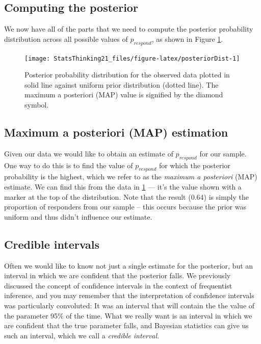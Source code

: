 \documentclass[
  12pt,
]{book}
\begin{document}
\hypertarget{computing-the-posterior-1}{%
\subsection{Computing the posterior}\label{computing-the-posterior-1}}

We now have all of the parts that we need to compute the posterior probability distribution across all possible values of \(p_{respond}\), as shown in Figure \ref{fig:posteriorDist}.

\begin{figure}
\texttt{[image: StatsThinking21\_files/figure-latex/posteriorDist-1]} \caption{Posterior probability distribution for the observed data plotted in solid line against uniform prior distribution (dotted line). The maximum a posteriori (MAP) value is signified by the diamond symbol.}\label{fig:posteriorDist}
\end{figure}

\hypertarget{maximum-a-posteriori-map-estimation}{%
\subsection{Maximum a posteriori (MAP) estimation}\label{maximum-a-posteriori-map-estimation}}

Given our data we would like to obtain an estimate of \(p_{respond}\) for our sample. One way to do this is to find the value of \(p_{respond}\) for which the posterior probability is the highest, which we refer to as the \emph{maximum a posteriori} (MAP) estimate. We can find this from the data in \ref{fig:posteriorDist} --- it's the value shown with a marker at the top of the distribution. Note that the result (0.64) is simply the proportion of responders from our sample -- this occurs because the prior was uniform and thus didn't influence our estimate.

\hypertarget{credible-intervals}{%
\subsection{Credible intervals}\label{credible-intervals}}

Often we would like to know not just a single estimate for the posterior, but an interval in which we are confident that the posterior falls. We previously discussed the concept of confidence intervals in the context of frequentist inference, and you may remember that the interpretation of confidence intervals was particularly convoluted: It was an interval that will contain the the value of the parameter 95\% of the time. What we really want is an interval in which we are confident that the true parameter falls, and Bayesian statistics can give us such an interval, which we call a \emph{credible interval}.
\end{document}
